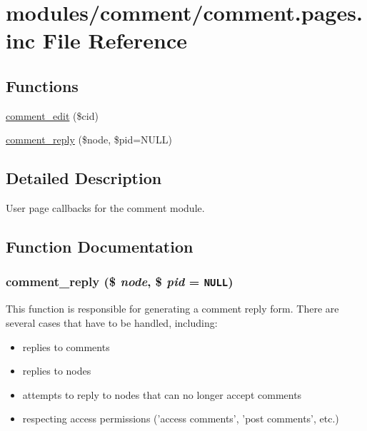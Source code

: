 \hypertarget{comment_8pages_8inc}{
\section{modules/comment/comment.pages.inc File Reference}
\label{comment_8pages_8inc}
}
\subsection*{Functions}
\begin{CompactItemize}
\item 
\hyperlink{group__forms_g3679a2cbccaa0c479918ff54748d5334}{comment\_\-edit} (\$cid)
\item 
\hyperlink{comment_8pages_8inc_1701de5fe8481441a5f48cf818aec5b1}{comment\_\-reply} (\$node, \$pid=NULL)
\end{CompactItemize}


\subsection{Detailed Description}
User page callbacks for the comment module. 

\subsection{Function Documentation}
\hypertarget{comment_8pages_8inc_1701de5fe8481441a5f48cf818aec5b1}{
\subsubsection[{comment\_\-reply}]{\setlength{\rightskip}{0pt plus 5cm}comment\_\-reply (\$ {\em node}, \/  \$ {\em pid} = {\tt NULL})}}
\label{comment_8pages_8inc_1701de5fe8481441a5f48cf818aec5b1}


This function is responsible for generating a comment reply form. There are several cases that have to be handled, including:\begin{itemize}
\item replies to comments\item replies to nodes\item attempts to reply to nodes that can no longer accept comments\item respecting access permissions ('access comments', 'post comments', etc.)\end{itemize}


